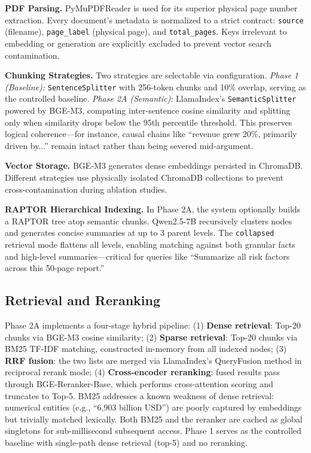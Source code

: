 \documentclass[11pt, a4paper]{article}
\begin{document}
\textbf{PDF Parsing.} PyMuPDFReader is used for its superior physical page number extraction. Every document's metadata is normalized to a strict contract: \texttt{source} (filename), \texttt{page\_label} (physical page), and \texttt{total\_pages}. Keys irrelevant to embedding or generation are explicitly excluded to prevent vector search contamination.

\textbf{Chunking Strategies.} Two strategies are selectable via configuration. \textit{Phase 1 (Baseline):} \texttt{SentenceSplitter} with 256-token chunks and 10\% overlap, serving as the controlled baseline. \textit{Phase 2A (Semantic):} LlamaIndex's \texttt{SemanticSplitter} powered by BGE-M3, computing inter-sentence cosine similarity and splitting only when similarity drops below the 95th percentile threshold. This preserves logical coherence---for instance, causal chains like ``revenue grew 20\%, primarily driven by...'' remain intact rather than being severed mid-argument.

\textbf{Vector Storage.} BGE-M3 generates dense embeddings persisted in ChromaDB. Different strategies use physically isolated ChromaDB collections to prevent cross-contamination during ablation studies.

\textbf{RAPTOR Hierarchical Indexing.} In Phase 2A, the system optionally builds a RAPTOR tree atop semantic chunks. Qwen2.5-7B recursively clusters nodes and generates concise summaries at up to 3 parent levels. The \texttt{collapsed} retrieval mode flattens all levels, enabling matching against both granular facts and high-level summaries---critical for queries like ``Summarize all risk factors across this 50-page report.''

\subsection{Retrieval and Reranking}

Phase 2A implements a four-stage hybrid pipeline: (1) \textbf{Dense retrieval}: Top-20 chunks via BGE-M3 cosine similarity; (2) \textbf{Sparse retrieval}: Top-20 chunks via BM25 TF-IDF matching, constructed in-memory from all indexed nodes; (3) \textbf{RRF fusion}: the two lists are merged via LlamaIndex's QueryFusion method in reciprocal rerank mode; (4) \textbf{Cross-encoder reranking}: fused results pass through BGE-Reranker-Base, which performs cross-attention scoring and truncates to Top-5. BM25 addresses a known weakness of dense retrieval: numerical entities (e.g., ``6,903 billion USD'') are poorly captured by embeddings but trivially matched lexically. Both BM25 and the reranker are cached as global singletons for sub-millisecond subsequent access. Phase 1 serves as the controlled baseline with single-path dense retrieval (top-5) and no reranking.
\end{document}
